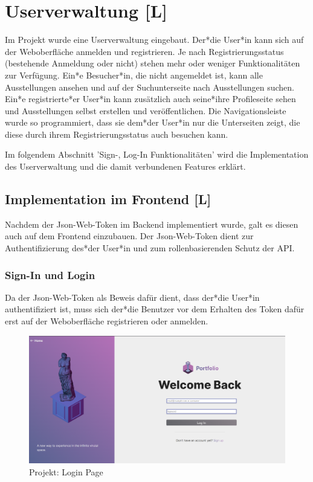 \section{Userverwaltung [L]}
Im Projekt wurde eine Userverwaltung eingebaut. Der*die User*in kann sich auf der Weboberfläche anmelden und registrieren. Je nach Registrierungsstatus (bestehende Anmeldung oder nicht) stehen mehr oder weniger Funktionalitäten zur Verfügung. Ein*e Besucher*in, die nicht angemeldet ist, kann alle Ausstellungen ansehen und auf der Suchunterseite nach Ausstellungen suchen. Ein*e registrierte*er User*in kann zusätzlich auch seine*ihre Profileseite sehen und Ausstellungen selbst erstellen und veröffentlichen. Die Navigationsleiste wurde so programmiert, dass sie dem*der User*in nur die Unterseiten zeigt, die diese durch ihrem Registrierungsstatus auch besuchen kann. 

Im folgendem Abschnitt 'Sign-, Log-In Funktionalitäten' wird die Implementation des Userverwaltung und die damit verbundenen Features erklärt. 

\subsection{Implementation im Frontend [L]}
Nachdem der Json-Web-Token im Backend implementiert wurde, galt es diesen auch auf dem Frontend einzubauen. Der Json-Web-Token dient zur Authentifizierung des*der User*in und zum rollenbasierenden Schutz der API. 

\subsubsection{Sign-In und Login}
Da der Json-Web-Token als Beweis dafür dient, dass der*die User*in authentifiziert ist, muss sich der*die Benutzer vor dem Erhalten des Token dafür erst auf der Weboberfläche registrieren oder anmelden. 

\begin{figure}
    \centering
    \includegraphics[scale=0.25]{pics/GalleryLogIn.png}
    \caption{Projekt: Login Page}
    \label{fig:impl:login}
\end{figure}

